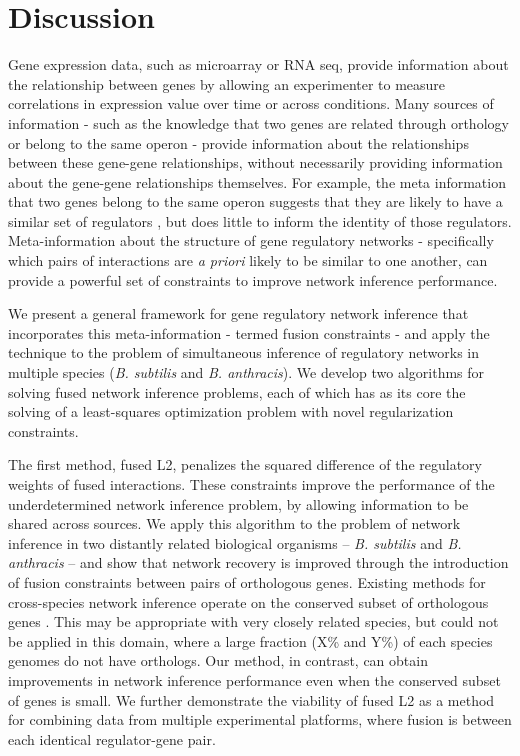 \documentclass[11pt]{article}
\begin{document}
\section{Discussion}
Gene expression data, such as microarray or RNA seq, provide information about the relationship between genes by allowing an experimenter to measure correlations in expression value over time or across conditions. Many sources of information - such as the knowledge that two genes are related through orthology or belong to the same operon - provide information about the relationships between these gene-gene relationships, without necessarily providing information about the gene-gene relationships themselves. For example, the meta information that two genes belong to the same operon suggests that they are likely to have a similar set of regulators \cite{lawrence_shared_2002}, but does little to inform the identity of those regulators. Meta-information about the structure of gene regulatory networks - specifically which pairs of interactions are \textit{a priori} likely to be similar to one another, can provide a powerful set of constraints to improve network inference performance. 

We present a general framework for gene regulatory network inference that incorporates this meta-information - termed fusion constraints - and apply the technique to the problem of simultaneous inference of regulatory networks in multiple species (\textit{B. subtilis} and \textit{B. anthracis}). We develop two algorithms for solving fused network inference problems, each of which has as its core the solving of a least-squares optimization problem with novel regularization constraints.

The first method, fused L2, penalizes the squared difference of the regulatory weights of fused interactions. These constraints improve the performance of the underdetermined network inference problem, by allowing information to be shared across sources. We apply this algorithm to the problem of network inference in two distantly related biological organisms -- \textit{B. subtilis} and \textit{B. anthracis} -- and show that network recovery is improved through the introduction of fusion constraints between pairs of orthologous genes. Existing methods for cross-species network inference operate on the conserved subset of orthologous genes \cite{dillman_comparative_2015}. This may be appropriate with very closely related species, but could not be applied in this domain, where a large fraction (X\% and Y\%) of each species genomes do not have orthologs. Our method, in contrast, can obtain improvements in network inference performance even when the conserved subset of genes is small. We further demonstrate the viability of fused L2 as a method for combining data from multiple experimental platforms, where fusion is between each identical regulator-gene pair. 
\end{document}
